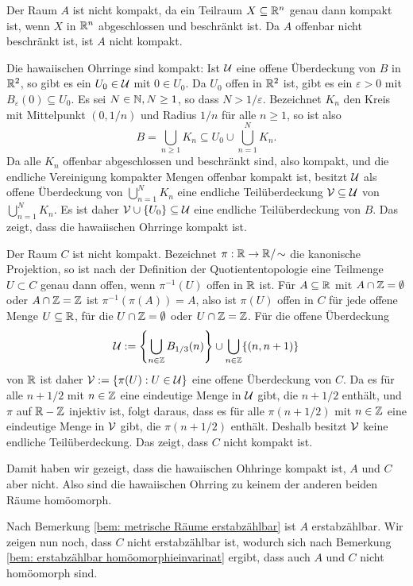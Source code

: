 \documentclass[a4paper,10pt]{article}
\begin{document}
Der Raum $A$ ist nicht kompakt, da ein Teilraum $X \subseteq \mathbb{R}^n$ genau dann kompakt ist, wenn $X$ in $\mathbb{R}^n$ abgeschlossen und beschränkt ist. Da $A$ offenbar nicht beschränkt ist, ist $A$ nicht kompakt.

Die hawaiischen Ohrringe sind kompakt: Ist $\mathcal{U}$ eine offene Überdeckung von $B$ in $\mathbb{R}^2$, so gibt es ein $U_0 \in \mathcal{U}$ mit $0 \in U_0$. Da $U_0$ offen in $\mathbb{R}^2$ ist, gibt es ein $\varepsilon > 0$ mit $B_\varepsilon(0) \subseteq U_0$. Es sei $N \in \mathbb{N}, N \geq 1$, so dass $N > 1/\varepsilon$. Bezeichnet $K_n$ den Kreis mit Mittelpunkt $(0,1/n)$ und Radius $1/n$ für alle $n \geq 1$, so ist also
\[
 B = \bigcup_{n \geq 1} K_n \subseteq U_0 \cup \bigcup_{n=1}^{N} K_n.
\]
Da alle $K_n$ offenbar abgeschlossen und beschränkt sind, also kompakt, und die endliche Vereinigung kompakter Mengen offenbar kompakt ist, besitzt $\mathcal{U}$ als offene Überdeckung von $\bigcup_{n=1}^N K_n$ eine endliche Teilüberdeckung $\mathcal{V} \subseteq \mathcal{U}$ von $\bigcup_{n=1}^N K_n$. Es ist daher $\mathcal{V} \cup \{U_0\} \subseteq \mathcal{U}$ eine endliche Teilüberdeckung von $B$. Das zeigt, dass die hawaiischen Ohrringe kompakt ist.

Der Raum $C$ ist nicht kompakt. Bezeichnet $\pi : \mathbb{R} \to \mathbb{R}/\!\sim$ die kanonische Projektion, so ist nach der Definition der Quotiententopologie eine Teilmenge $U \subset C$ genau dann offen, wenn $\pi^{-1}(U)$ offen in $\mathbb{R}$ ist. Für $A \subseteq \mathbb{R}$ mit $A \cap \mathbb{Z} = \emptyset$ oder $A \cap \mathbb{Z} = \mathbb{Z}$ ist $\pi^{-1}(\pi(A)) = A$, also ist $\pi(U)$ offen in $C$ für jede offene Menge $U \subseteq \mathbb{R}$, für die $U \cap \mathbb{Z} = \emptyset$ oder $U \cap \mathbb{Z} = \mathbb{Z}$. Für die offene Überdeckung
\[
 \mathcal{U} := \left\{ \bigcup_{n \in \mathbb{Z}} B_{1/3}(n) \right\} \cup \bigcup_{n \in \mathbb{Z}} \{(n,n+1)\}
\]
von $\mathbb{R}$ ist daher $\mathcal{V} := \{\pi(U) : U \in \mathcal{U}\}$ eine offene Überdeckung von $C$. Da es für alle $n+1/2$ mit $n \in \mathbb{Z}$ eine eindeutige Menge in $\mathcal{U}$ gibt, die $n+1/2$ enthält, und $\pi$ auf $\mathbb{R}-\mathbb{Z}$ injektiv ist, folgt daraus, dass es für alle $\pi(n+1/2)$ mit $n \in \mathbb{Z}$ eine eindeutige Menge in $\mathcal{V}$ gibt, die $\pi(n+1/2)$ enthält. Deshalb besitzt $\mathcal{V}$ keine endliche Teilüberdeckung. Das zeigt, dass $C$ nicht kompakt ist.

Damit haben wir gezeigt, dass die hawaiischen Ohhringe kompakt ist, $A$ und $C$ aber nicht. Also sind die hawaiischen Ohrring zu keinem der anderen beiden Räume homöomorph.

Nach Bemerkung \ref{bem: metrische Räume erstabzählbar} ist $A$ erstabzählbar. Wir zeigen nun noch, dass $C$ nicht erstabzählbar ist, wodurch sich nach Bemerkung \ref{bem: erstabzählbar homöomorphieinvarinat} ergibt, dass auch $A$ und $C$ nicht homöomorph sind.
\end{document}
